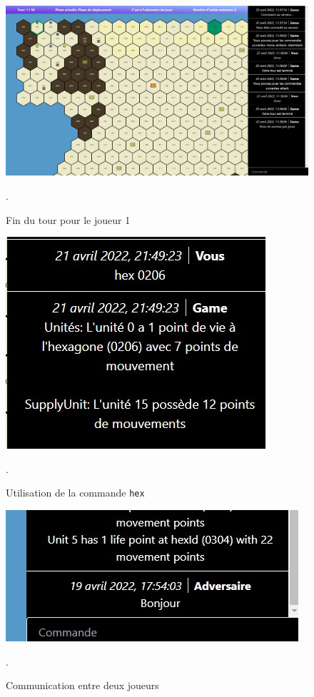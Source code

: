 \begin{figure}[H]
    \centering
    \includegraphics[scale=0.35]{data/fin_tour.jpg}
    \caption{Fin du tour pour le joueur 1}.
    \label{fig:fin_tour}
\end{figure}


\begin{figure}[H]
    \centering
    \includegraphics[scale=0.75]{data/hex_command.jpg}
    \caption{Utilisation de la commande {\tt hex}}.
    \label{fig:hex_command}
\end{figure}

\begin{figure}[H]
    \centering
    \includegraphics[scale=0.6]{data/chat.jpg}
    \caption{Communication entre deux joueurs}.
    \label{fig:message_command}
\end{figure}

